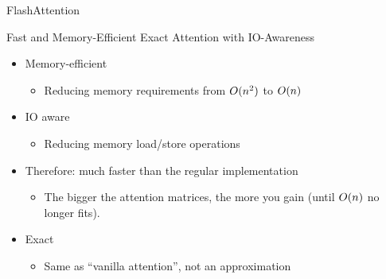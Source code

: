 \documentclass[11pt,compress,t,notes=noshow, xcolor=table]{beamer}
\begin{document}




\begin{vbframe}{F\MakeLowercase{lash}A\MakeLowercase{ttention}}

\vfill

Fast and Memory-Efficient Exact Attention with IO-Awareness \newline

\begin{itemize}
	\item Memory-efficient
	\begin{itemize}
	\item Reducing memory requirements from $O(\MakeLowercase{n}^2)$
          to $O(\MakeLowercase{n})$ 
	\end{itemize}
	\item IO aware
	\begin{itemize}
		\item Reducing memory load/store operations
	\end{itemize}
	\item Therefore: much faster than the regular implementation
	\begin{itemize}
		\item The bigger the attention matrices, the
                  more you gain (until
                  $O(\MakeLowercase{n})$ no longer fits).
	\end{itemize}
	\item Exact
	\begin{itemize}
		\item Same as ``vanilla attention'', not an approximation 
	\end{itemize}
\end{itemize}

\vfill

\end{vbframe}
\end{document}

